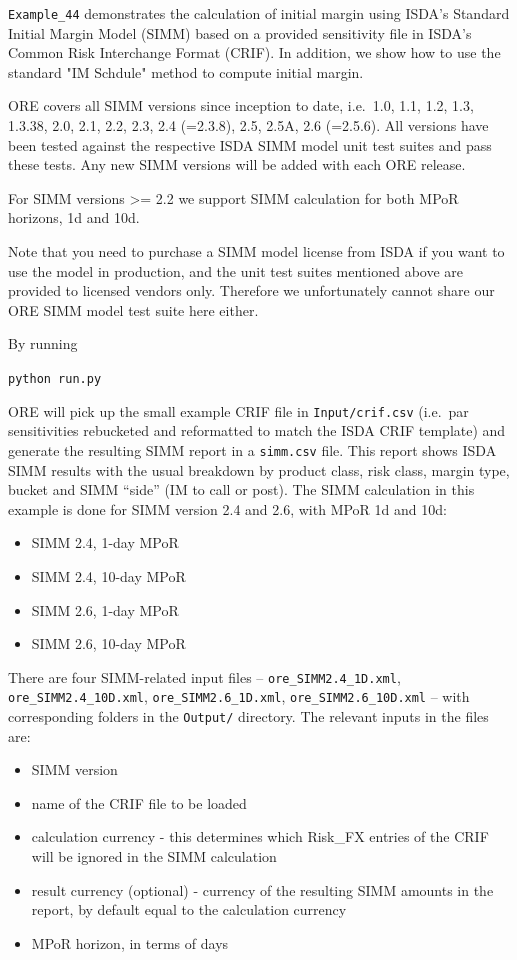 {\tt Example\_44} demonstrates the calculation of initial margin using ISDA's Standard Initial Margin Model (SIMM) based on a provided
sensitivity file in ISDA's Common Risk Interchange Format (CRIF). In addition, we show how to use the standard "IM Schdule" method to compute
initial margin.

ORE covers all SIMM versions since inception to date, i.e.\ 1.0, 1.1, 1.2, 1.3, 1.3.38, 2.0, 2.1, 2.2, 2.3, 2.4 (=2.3.8), 2.5, 2.5A, 2.6 (=2.5.6).
All versions have been tested against the respective ISDA SIMM model unit test suites and pass these tests.
Any new SIMM versions will be added with each ORE release.

For SIMM versions >= 2.2 we support SIMM calculation for both MPoR horizons, 1d and 10d.

Note that you need to purchase a SIMM model license from ISDA if you want to use the model in production, and the unit test
suites mentioned above are provided to licensed vendors only. Therefore we unfortunately cannot share our ORE SIMM model
test suite here either.

By running \\
\medskip
\centerline{{\tt python run.py}}

\medskip
ORE will pick up the small example CRIF file in {\tt Input/crif.csv} (i.e.\ par sensitivities rebucketed and reformatted to match the ISDA CRIF template) and generate the resulting SIMM report in a {\tt simm.csv} file.
This report shows ISDA SIMM results with the usual breakdown by product class, risk class, margin type, bucket and SIMM ``side'' (IM to call or post).
The SIMM calculation in this example is done for SIMM version 2.4 and 2.6, with MPoR 1d and 10d:

\begin{itemize}
  \item SIMM 2.4, 1-day MPoR
  \item SIMM 2.4, 10-day MPoR
  \item SIMM 2.6, 1-day MPoR
  \item SIMM 2.6, 10-day MPoR
\end{itemize}

\medskip
There are four SIMM-related input files -- {\tt ore\_SIMM2.4\_1D.xml}, {\tt ore\_SIMM2.4\_10D.xml}, {\tt ore\_SIMM2.6\_1D.xml}, {\tt ore\_SIMM2.6\_10D.xml} -- with corresponding folders in the {\tt Output/} directory.
The relevant inputs in the files are:

\begin{itemize}
\item SIMM version
\item name of the CRIF file to be loaded
\item calculation currency - this determines which Risk\_FX entries of the CRIF will be ignored in the SIMM calculation
\item result currency (optional) - currency of the resulting SIMM amounts in the report, by default equal to the calculation currency
\item MPoR horizon, in terms of days
\end{itemize}

